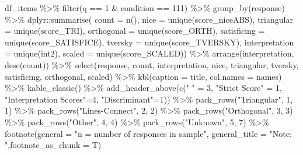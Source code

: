 \documentclass[
  letterpaper,
  DIV=11,
  numbers=noendperiod]{scrreprt}
\newenvironment{Shaded}{\begin{snugshade}}{\end{snugshade}}
\newcommand{\AttributeTok}[1]{\textcolor[rgb]{0.40,0.45,0.13}{#1}}
\newcommand{\DecValTok}[1]{\textcolor[rgb]{0.68,0.00,0.00}{#1}}
\newcommand{\FunctionTok}[1]{\textcolor[rgb]{0.28,0.35,0.67}{#1}}
\newcommand{\NormalTok}[1]{\textcolor[rgb]{0.00,0.23,0.31}{#1}}
\newcommand{\OtherTok}[1]{\textcolor[rgb]{0.00,0.23,0.31}{#1}}
\newcommand{\SpecialCharTok}[1]{\textcolor[rgb]{0.37,0.37,0.37}{#1}}
\newcommand{\StringTok}[1]{\textcolor[rgb]{0.13,0.47,0.30}{#1}}
\begin{document}
\begin{Shaded}
\begin{Highlighting}[]
\NormalTok{df\_items }\SpecialCharTok{\%\textgreater{}\%} \FunctionTok{filter}\NormalTok{(q }\SpecialCharTok{==} \DecValTok{1} \SpecialCharTok{\&}\NormalTok{ condition }\SpecialCharTok{==} \DecValTok{111}\NormalTok{) }\SpecialCharTok{\%\textgreater{}\%} \FunctionTok{group\_by}\NormalTok{(response) }\SpecialCharTok{\%\textgreater{}\%} 
\NormalTok{  dplyr}\SpecialCharTok{::}\FunctionTok{summarise}\NormalTok{( }\AttributeTok{count =} \FunctionTok{n}\NormalTok{(), }
                    \AttributeTok{nice =} \FunctionTok{unique}\NormalTok{(score\_niceABS),}
                    \AttributeTok{triangular =} \FunctionTok{unique}\NormalTok{(score\_TRI), }
                    \AttributeTok{orthogonal =}  \FunctionTok{unique}\NormalTok{(score\_ORTH),}
                    \AttributeTok{satisficing =}  \FunctionTok{unique}\NormalTok{(score\_SATISFICE),}
                    \AttributeTok{tversky =} \FunctionTok{unique}\NormalTok{(score\_TVERSKY),}
                    \AttributeTok{interpretation =} \FunctionTok{unique}\NormalTok{(int2),}
                    \AttributeTok{scaled =} \FunctionTok{unique}\NormalTok{(score\_SCALED)) }\SpecialCharTok{\%\textgreater{}\%} 
  \FunctionTok{arrange}\NormalTok{(interpretation, }\FunctionTok{desc}\NormalTok{(count)) }\SpecialCharTok{\%\textgreater{}\%} 
  \FunctionTok{select}\NormalTok{(response, count, interpretation, nice, }
\NormalTok{         triangular, tversky, satisficing, orthogonal, scaled) }\SpecialCharTok{\%\textgreater{}\%} 
  \FunctionTok{kbl}\NormalTok{(}\AttributeTok{caption =}\NormalTok{ title, }\AttributeTok{col.names =}\NormalTok{ names) }\SpecialCharTok{\%\textgreater{}\%}  \FunctionTok{kable\_classic}\NormalTok{() }\SpecialCharTok{\%\textgreater{}\%} 
  \FunctionTok{add\_header\_above}\NormalTok{(}\FunctionTok{c}\NormalTok{(}\StringTok{" "} \OtherTok{=} \DecValTok{3}\NormalTok{, }\StringTok{"Strict Score"} \OtherTok{=} \DecValTok{1}\NormalTok{, }\StringTok{"Interpretation Scores"}\OtherTok{=}\DecValTok{4}\NormalTok{, }\StringTok{"Discriminant"}\OtherTok{=}\DecValTok{1}\NormalTok{)) }\SpecialCharTok{\%\textgreater{}\%}
  \FunctionTok{pack\_rows}\NormalTok{(}\StringTok{"Triangular"}\NormalTok{, }\DecValTok{1}\NormalTok{, }\DecValTok{1}\NormalTok{) }\SpecialCharTok{\%\textgreater{}\%} 
  \FunctionTok{pack\_rows}\NormalTok{(}\StringTok{"Lines{-}Connect"}\NormalTok{, }\DecValTok{2}\NormalTok{, }\DecValTok{2}\NormalTok{) }\SpecialCharTok{\%\textgreater{}\%} 
  \FunctionTok{pack\_rows}\NormalTok{(}\StringTok{"Orthogonal"}\NormalTok{, }\DecValTok{3}\NormalTok{, }\DecValTok{3}\NormalTok{) }\SpecialCharTok{\%\textgreater{}\%} 
  \FunctionTok{pack\_rows}\NormalTok{(}\StringTok{"Other"}\NormalTok{, }\DecValTok{4}\NormalTok{, }\DecValTok{4}\NormalTok{)  }\SpecialCharTok{\%\textgreater{}\%} 
  \FunctionTok{pack\_rows}\NormalTok{(}\StringTok{"Unknown"}\NormalTok{, }\DecValTok{5}\NormalTok{, }\DecValTok{7}\NormalTok{)  }\SpecialCharTok{\%\textgreater{}\%} 
  \FunctionTok{footnote}\NormalTok{(}\AttributeTok{general =} \StringTok{"n = number of responses in sample"}\NormalTok{, }
           \AttributeTok{general\_title =} \StringTok{"Note: "}\NormalTok{,}\AttributeTok{footnote\_as\_chunk =}\NormalTok{ T) }
\end{Highlighting}
\end{Shaded}
\end{document}
